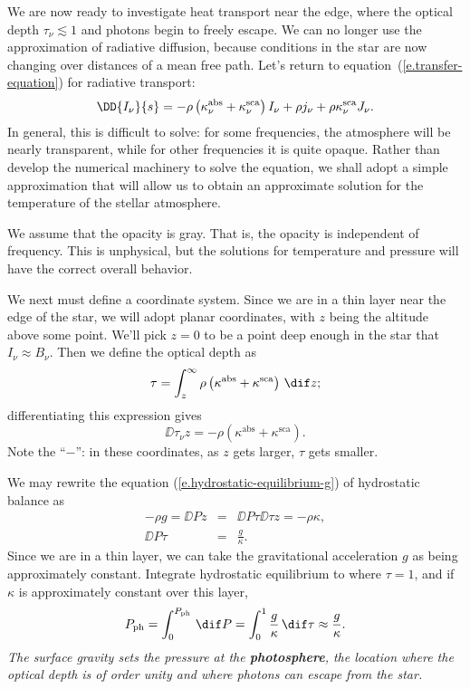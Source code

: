 
We are now ready to investigate heat transport near the edge, where the optical depth $\tau_{\nu} \lesssim 1$ and photons begin to freely escape. We can no longer use the approximation of radiative diffusion, because conditions in the star are now changing over distances of a mean free path. Let's return to equation~(\ref{e.transfer-equation}) for radiative transport:
\[
	\DD{I_{\nu}}{s} = -\rho\left(\kapabs + \kapscat\right) I_{\nu} + \rho j_{\nu} + \rho\kapscat J_{\nu}.
\]
In general, this is difficult to solve: for some frequencies, the atmosphere will be nearly transparent, while for other frequencies it is quite opaque. Rather than develop the numerical machinery to solve the equation, we shall adopt a simple approximation that will allow us to obtain an approximate solution for the temperature of the stellar atmosphere.

We assume that the opacity is gray. That is, the opacity is independent of frequency. This is unphysical, but the solutions for temperature and pressure will have the correct overall behavior.

We next must define a coordinate system. Since we are in a thin layer near the edge of the star, we will adopt planar coordinates, with $z$ being the altitude above some point. We'll pick $z=0$ to be a point deep enough in the star that $I_{\nu}\approx B_{\nu}$. Then we define the optical depth as
\begin{equation}\label{e.optical-depth-planar}
	\tau = \int_{z}^{\infty} \rho\left(\kappa^{\mathrm{abs}}+\kappa^{\mathrm{sca}}\right)\,\dif z ;
\end{equation}
differentiating this expression gives
\[
	\DD{\tau_{\nu}}{z} = -\rho\left(\kappa^{\mathrm{abs}}+\kappa^{\mathrm{sca}}\right).
\]
Note the ``$-$'': in these coordinates, as $z$ gets larger, $\tau$ gets smaller.

We may rewrite the equation (\ref{e.hydrostatic-equilibrium-g}) of hydrostatic balance as
\begin{eqnarray}
	-\rho g = \DD{P}{z} &=& \DD{P}{\tau}\DD{\tau}{z} = -\rho\kappa,\nonumber\\
	\DD{P}{\tau} &=& \frac{g}{\kappa}.
\label{e.P-tau}
\end{eqnarray}
Since we are in a thin layer, we can take the gravitational acceleration $g$ as being approximately constant. Integrate hydrostatic equilibrium to where $\tau = 1$, and if $\kappa$ is approximately constant over this layer,
\[
	P_{\mathrm{ph}} = \int_{0}^{P_{\mathrm{ph}}}\,\dif P = \int_{0}^{1}\frac{g}{\kappa}\,\dif\tau \approx \frac{g}{\kappa}.
\]
\emph{The surface gravity sets the pressure at the \textbf{photosphere}, the location where the optical depth is of order unity and where photons can escape from the star.}

